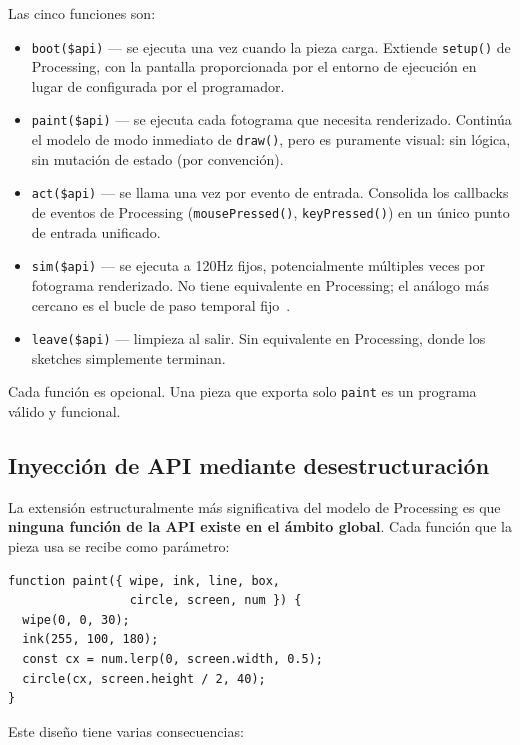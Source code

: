 \documentclass[10pt,letterpaper,twocolumn]{article}
\begin{document}
Las cinco funciones son:

\begin{itemize}
  \item \texttt{boot(\$api)} --- se ejecuta una vez cuando la pieza carga. Extiende \texttt{setup()} de Processing, con la pantalla proporcionada por el entorno de ejecución en lugar de configurada por el programador.
  \item \texttt{paint(\$api)} --- se ejecuta cada fotograma que necesita renderizado. Continúa el modelo de modo inmediato de \texttt{draw()}, pero es puramente visual: sin lógica, sin mutación de estado (por convención).
  \item \texttt{act(\$api)} --- se llama una vez por evento de entrada. Consolida los callbacks de eventos de Processing (\texttt{mousePressed()}, \texttt{keyPressed()}) en un único punto de entrada unificado.
  \item \texttt{sim(\$api)} --- se ejecuta a 120Hz fijos, potencialmente múltiples veces por fotograma renderizado. No tiene equivalente en Processing; el análogo más cercano es el bucle de paso temporal fijo~\citep{nystrom2014game}.
  \item \texttt{leave(\$api)} --- limpieza al salir. Sin equivalente en Processing, donde los sketches simplemente terminan.
\end{itemize}

Cada función es opcional. Una pieza que exporta solo \texttt{paint} es un programa válido y funcional.

\subsection{Inyección de API mediante desestructuración}

La extensión estructuralmente más significativa del modelo de Processing es que \textbf{ninguna función de la API existe en el ámbito global}. Cada función que la pieza usa se recibe como parámetro:

\begin{lstlisting}[style=acjsstyle,caption={Desestructuración de API en AC.}]
function paint({ wipe, ink, line, box,
                 circle, screen, num }) {
  wipe(0, 0, 30);
  ink(255, 100, 180);
  const cx = num.lerp(0, screen.width, 0.5);
  circle(cx, screen.height / 2, 40);
}
\end{lstlisting}

Este diseño tiene varias consecuencias:
\end{document}
